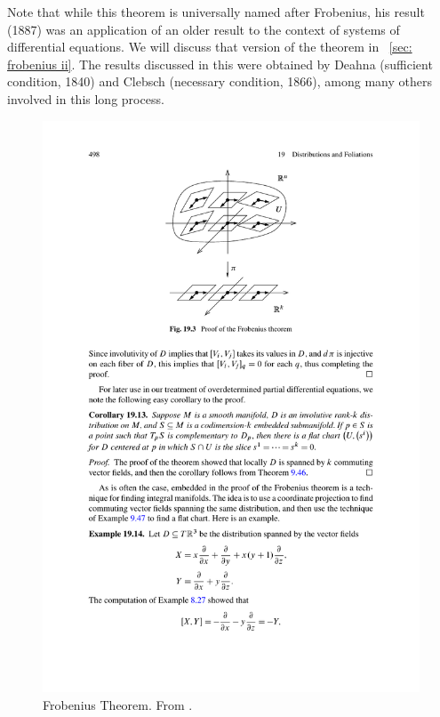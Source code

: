 \begin{hrem*}
    Note that while this theorem is universally named after Frobenius, his result (1887) was an application of an older result to the context of systems of differential equations. We will discuss that version of the theorem in \sect~\ref{sec: frobenius ii}. The results discussed in this \sect{} were obtained by Deahna (sufficient condition, 1840) and Clebsch (necessary condition, 1866), among many others involved in this long process.
\end{hrem*}

\begin{figure}
    \centering
    \includegraphics[scale=0.8]{figures/frobenius_1.pdf}
    \caption{Frobenius Theorem. From \cite{Lee}.}
    \label{fig: frobenius1}
\end{figure}

